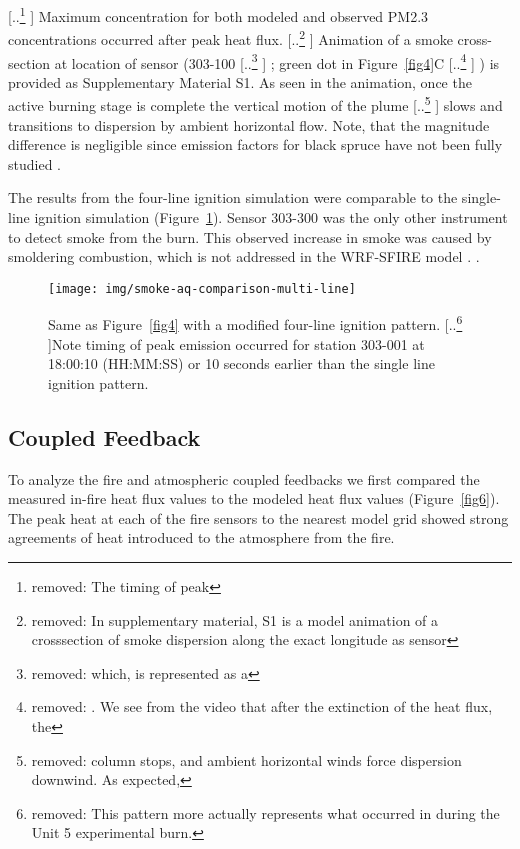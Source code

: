 \documentclass[preprints,article,accept,moreauthors,pdftex]{Definitions/mdpi}
\providecommand{\DIFadd}[1]{{\protect\color{blue} \sf #1}} %
\providecommand{\DIFdel}[1]{{\protect\color{red} [..\footnote{removed: #1} ]}} %
\providecommand{\DIFaddbegin}{} %
\providecommand{\DIFaddend}{} %
\providecommand{\DIFdelbegin}{} %
\providecommand{\DIFdelend}{} %
\providecommand{\DIFdelFL}[1]{\DIFdel{#1}} %
\providecommand{\DIFdelbeginFL}{} %
\providecommand{\DIFdelendFL}{} %
\begin{document}
\DIFdelbegin \DIFdel{The timing of peak }\DIFdelend \DIFaddbegin \DIFadd{Maximum }\DIFaddend concentration for both modeled and observed \DIFaddbegin \DIFadd{PM2.3 concentrations }\DIFaddend occurred after peak heat flux.
\DIFdelbegin \DIFdel{In supplementary material, S1 is a model animation of a crosssection of smoke dispersion along the exact longitude as sensor }\DIFdelend \DIFaddbegin \DIFadd{Animation of a smoke cross-section at location of sensor (}\DIFaddend 303-100\DIFdelbegin \DIFdel{which, is represented as a }\DIFdelend \DIFaddbegin \DIFadd{; }\DIFaddend green dot in Figure~\ref{fig4}C\DIFdelbegin \DIFdel{. We see from the video that after the extinction of the heat flux, the }\DIFdelend \DIFaddbegin \DIFadd{) is provided as Supplementary Material S1. As seen in the animation, once the active burning stage is complete
the }\DIFaddend vertical motion of the plume \DIFdelbegin \DIFdel{column stops, and ambient horizontal winds force dispersion downwind. As expected, }\DIFdelend \DIFaddbegin \DIFadd{slows and transitions to dispersion by ambient horizontal flow. Note, that }\DIFaddend the magnitude difference is negligible since emission factors for black spruce have not been fully studied \cite{prichard_wildland_2020}.

The results from the four-line ignition simulation were comparable to the single-line ignition simulation (Figure~\ref{fig5}). Sensor 303-300 was the only other instrument to detect smoke from the burn. This observed increase in smoke was caused by smoldering combustion, which is not addressed in the WRF-SFIRE model\DIFaddbegin \DIFadd{. }\DIFaddend \cite{mallia_incorporating_2020,mandel_coupled_2011,mandel_recent_2014}.

\begin{figure}[H]
\centering
 \texttt{[image: img/smoke-aq-comparison-multi-line]}
 \caption{Same as Figure~\ref{fig4} with a modified four-line ignition pattern.  \DIFdelbeginFL \DIFdelFL{This pattern more actually represents what occurred in during the Unit 5 experimental burn. }\DIFdelendFL Note timing of peak emission occurred for station 303-001 at 18:00:10 (HH:MM:SS) or 10 seconds earlier than the single line ignition pattern.\label{fig5}}
 \end{figure}


\subsection{Coupled Feedback}

To analyze the fire and atmospheric coupled feedbacks we first compared the measured in-fire heat flux values to the modeled heat flux values (Figure~\ref{fig6}). The peak heat at each of the fire sensors to the nearest model grid showed strong agreements of heat introduced to the atmosphere from the fire.
\end{document}
